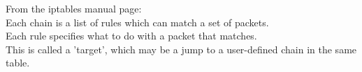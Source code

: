 From the iptables manual page: \\
Each  chain  is a list of rules which can match a set of packets. \\
Each rule specifies what to do with a packet that matches. \\
This is called a 'target', which may be a jump to a user-defined chain in the same table.
